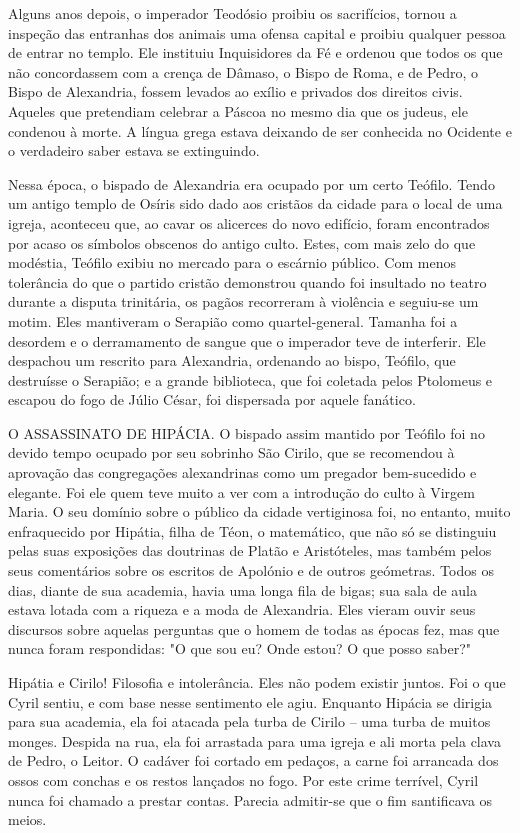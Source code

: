 \documentclass[11pt,a5paper,twoside,openany]{book}
\begin{document}
Alguns anos depois, o imperador Teodósio proibiu os sacrifícios, tornou a inspeção das entranhas dos animais uma ofensa capital e proibiu qualquer pessoa de entrar no templo. Ele instituiu Inquisidores da Fé e ordenou que todos os que não concordassem com a crença de Dâmaso, o Bispo de Roma, e de Pedro, o Bispo de Alexandria, fossem levados ao exílio e privados dos direitos civis. Aqueles que pretendiam celebrar a Páscoa no mesmo dia que os judeus, ele condenou à morte. A língua grega estava deixando de ser conhecida no Ocidente e o verdadeiro saber estava se extinguindo.

Nessa época, o bispado de Alexandria era ocupado por um certo Teófilo. Tendo um antigo templo de Osíris sido dado aos cristãos da cidade para o local de uma igreja, aconteceu que, ao cavar os alicerces do novo edifício, foram encontrados por acaso os símbolos obscenos do antigo culto. Estes, com mais zelo do que modéstia, Teófilo exibiu no mercado para o escárnio público. Com menos tolerância do que o partido cristão demonstrou quando foi insultado no teatro durante a disputa trinitária, os pagãos recorreram à violência e seguiu-se um motim. Eles mantiveram o Serapião como quartel-general. Tamanha foi a desordem e o derramamento de sangue que o imperador teve de interferir. Ele despachou um rescrito para Alexandria, ordenando ao bispo, Teófilo, que destruísse o Serapião; e a grande biblioteca, que foi coletada pelos Ptolomeus e escapou do fogo de Júlio César, foi dispersada por aquele fanático.

O ASSASSINATO DE HIPÁCIA. O bispado assim mantido por Teófilo foi no devido tempo ocupado por seu sobrinho São Cirilo, que se recomendou à aprovação das congregações alexandrinas como um pregador bem-sucedido e elegante. Foi ele quem teve muito a ver com a introdução do culto à Virgem Maria. O seu domínio sobre o público da cidade vertiginosa foi, no entanto, muito enfraquecido por Hipátia, filha de Téon, o matemático, que não só se distinguiu pelas suas exposições das doutrinas de Platão e Aristóteles, mas também pelos seus comentários sobre os escritos de Apolónio e de outros geómetras. Todos os dias, diante de sua academia, havia uma longa fila de bigas; sua sala de aula estava lotada com a riqueza e a moda de Alexandria. Eles vieram ouvir seus discursos sobre aquelas perguntas que o homem de todas as épocas fez, mas que nunca foram respondidas: "O que sou eu? Onde estou? O que posso saber?"

Hipátia e Cirilo! Filosofia e intolerância. Eles não podem existir juntos. Foi o que Cyril sentiu, e com base nesse sentimento ele agiu. Enquanto Hipácia se dirigia para sua academia, ela foi atacada pela turba de Cirilo – uma turba de muitos monges. Despida na rua, ela foi arrastada para uma igreja e ali morta pela clava de Pedro, o Leitor. O cadáver foi cortado em pedaços, a carne foi arrancada dos ossos com conchas e os restos lançados no fogo. Por este crime terrível, Cyril nunca foi chamado a prestar contas. Parecia admitir-se que o fim santificava os meios.
\end{document}
